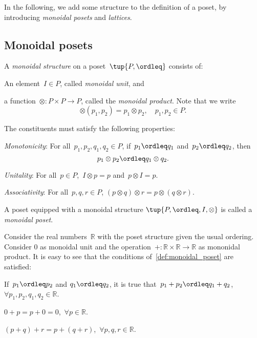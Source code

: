 In the following, we add some structure to the definition of a poset, by introducing \emph{monoidal posets} and \emph{lattices}.
\subsection{Monoidal posets}
\begin{definition}
\label{def:monoidal_poset}
A \emph{monoidal structure} on a poset~$\tup{P,\ordleq}$ consists of:
\begin{compactenum}
    \item An element~$I\in P$, called \emph{monoidal unit}, and
    \item a function~$\otimes\colon P\times P\to P$, called the \emph{monoidal product}. Note that we write
    \begin{equation}
        \otimes(p_1,p_2)=p_1\otimes p_2, \quad p_1,p_2\in P.
    \end{equation}
\end{compactenum}
The constituents must satisfy the following properties:
\begin{compactenum}[(a)]
    \item \emph{Monotonicity}: For all~$p_1,p_2,q_1,q_2\in P$, if~$p_1\ordleq q_1$ and~$p_2\ordleq q_2$, then
    \begin{equation*}
    p_1\otimes p_2\ordleq q_1\otimes q_2.
    \end{equation*}
    \item \emph{Unitality}: For all~$p\in P$,~$I\otimes p=p$ and~$p\otimes I=p$.
    \item \emph{Associativity}: For all~$p,q,r\in P$, $(p\otimes q)\otimes r=p\otimes (q\otimes r)$.
\end{compactenum}
A poset equipped with a monoidal structure $\tup{P,\ordleq,I,\otimes}$ is called a \emph{monoidal poset}.
\end{definition}

\begin{example}
Consider the real numbers~$\mathbb{R}$ with the poset structure given the usual ordering. Consider 0 as monoidal unit and the operation~$+\colon \mathbb{R}\times \mathbb{R}\to \mathbb{R}$ as mononidal product. It is easy to see that the conditions of~\cref{def:monoidal_poset} are satisfied:
\begin{compactenum}[(a)]
    \item If~$p_1\ordleq p_2$ and $q_1\ordleq q_2$, it is true that~$p_1+p_2\ordleq q_1+q_2$,~$\forall p_1,p_2,q_1,q_2\in \mathbb{R}$.
    \item $0+p=p+0=0$,~$\forall p\in \mathbb{R}$.
    \item $(p+q)+r=p+(q+r)$,~$\forall p,q,r\in \mathbb{R}$.
\end{compactenum}
\end{example}
